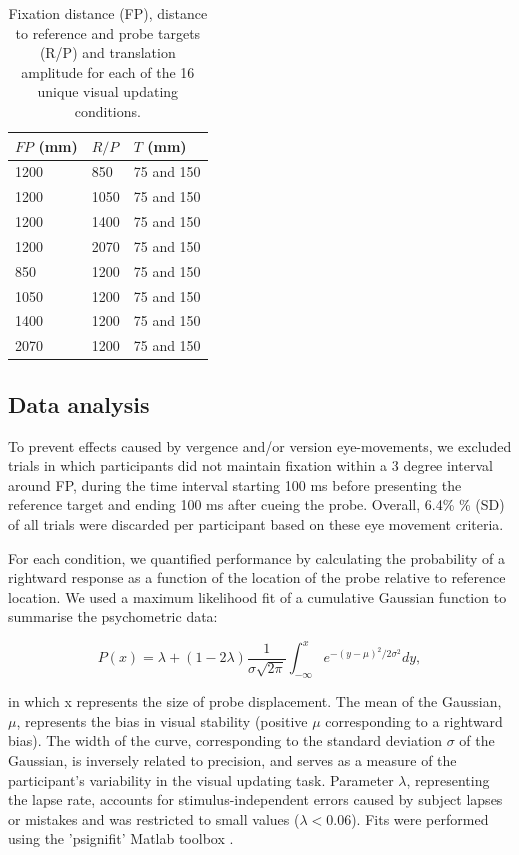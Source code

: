 \begin{table}
    \begin{tabular}{lll}
    $FP$ (mm) & $R/P$ & $T$ (mm) \\
    \hline
    1200 & 850 & 75 and 150 \\
    1200 & 1050 & 75 and 150 \\
    1200 & 1400 & 75 and 150 \\
    1200 & 2070 & 75 and 150 \\
    850 & 1200 & 75 and 150 \\
    1050 & 1200 & 75 and 150 \\
    1400 & 1200 & 75 and 150 \\
    2070 & 1200 & 75 and 150 \\
    \end{tabular}

    \caption{Fixation distance (FP), distance to reference and probe targets (R/P) and translation amplitude for each of the 16 unique visual updating conditions.}

    \label{p2:tab1}
\end{table}

\subsection{Data analysis}

To prevent effects caused by vergence and/or version eye-movements, we excluded trials in which participants did not maintain fixation within a 3 degree interval around FP, during the time interval starting 100 \si{\milli\second} before presenting the reference target and ending 100 \si{\milli\second} after cueing the probe. Overall, 6.4\% \% ({\textpm}SD) of all trials were discarded per participant based on these eye movement criteria.

For each condition, we quantified performance by calculating the probability of a rightward response as a function of the location of the probe relative to reference location. We used a maximum likelihood fit of a cumulative Gaussian function to summarise the psychometric data:

\begin{equation}
\label{p2:eq1}
P(x) = \lambda + (1 - 2\lambda) \frac{1}{\sigma \sqrt{2\pi}} \int_{-\infty}^{x}{e^{-(y-\mu)^2 / 2\sigma^2}}dy,
\end{equation}

in which x represents the size of probe displacement. The mean of the Gaussian, $\mu$, represents the bias in visual stability (positive $\mu$ corresponding to a rightward bias). The width of the curve, corresponding to the standard deviation $\sigma$ of the Gaussian, is inversely related to precision, and serves as a measure of the participant's variability in the visual updating task. Parameter $\lambda$, representing the lapse rate, accounts for stimulus-independent errors caused by subject lapses or mistakes and was restricted to small values ($\lambda < 0.06$). Fits were performed using the 'psignifit' Matlab toolbox \cite{wichmann2001, wichmann2001b}.


